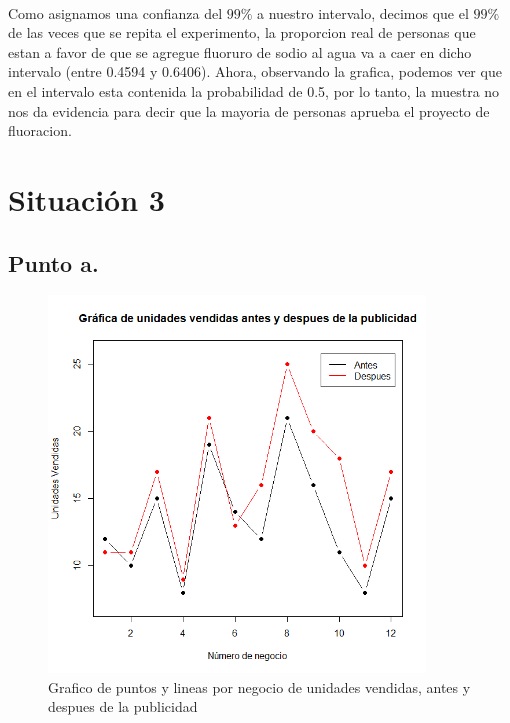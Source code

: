 \documentclass[letterpaper,12pt,onecolumn,titlepage]{article}
\begin{document}
~\\ Como asignamos una confianza del $99\%$ a nuestro intervalo, decimos que el $99\%$ de las veces que se repita el experimento, la proporcion real de personas que estan a favor de que se agregue fluoruro de sodio al agua va a caer en dicho intervalo (entre 0.4594 y 0.6406). Ahora, observando la grafica, podemos ver que en el intervalo esta contenida la probabilidad de 0.5, por lo tanto, la muestra no nos da evidencia para decir que la mayoria de personas aprueba el proyecto de fluoracion.

\pagebreak\section{Situaci\'{o}n 3}
\subsection{Punto a.}
 \begin{figure}[!h]
    \begin{center}
        \includegraphics[width=10cm]{Figuras/Grafico2.png}
        \caption{Grafico de puntos y lineas por negocio de unidades vendidas, antes y despues de la publicidad}
        \label{fig:Densidad}
    \end{center}
\end{figure}
\end{document}
